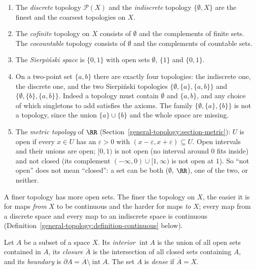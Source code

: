 \begin{example}\label{general-topology:example-topologies}
\begin{enumerate}
\item The \emph{discrete} topology $\mathcal{P}(X)$ and the \emph{indiscrete} topology $\{\emptyset, X\}$ are the finest and the
coarsest topologies on $X$.
\item The \emph{cofinite} topology on $X$ consists of $\emptyset$ and the complements of finite sets. The \emph{cocountable} topology
consists of $\emptyset$ and the complements of countable sets.
\item The \emph{Sierpi\'nski space} is $\{0, 1\}$ with open sets $\emptyset$, $\{1\}$ and $\{0, 1\}$.
\item On a two-point set $\{a, b\}$ there are exactly four topologies: the indiscrete one, the discrete one, and the two Sierpi\'nski topologies $\{\emptyset, \{a\}, \{a, b\}\}$ and
$\{\emptyset, \{b\}, \{a, b\}\}$. Indeed a topology must contain $\emptyset$ and $\{a, b\}$, and any choice of which singletons to add satisfies the axioms. The family $\{\emptyset, \{a\}, \{b\}\}$ is not a
topology, since the union $\{a\} \cup \{b\}$ and the whole space are missing.
\item The \emph{metric topology} of $\RR$ (Section~\ref{general-topology:section-metric}): $U$ is open if every $x \in U$ has an $\varepsilon > 0$ with $(x - \varepsilon, x + \varepsilon) \subseteq U$. Open
intervals and their unions are open; $[0, 1)$ is not open (no interval around $0$ fits inside) and not closed (its complement $(-\infty, 0) \cup [1, \infty)$ is not open at $1$). So ``not open'' does not mean
``closed'': a set can be both ($\emptyset$, $\RR$), one of the two, or neither.
\end{enumerate}
A finer topology has more open sets. The finer the topology on $X$, the easier it is for maps \emph{from} $X$ to be continuous and the harder for maps \emph{to} $X$; every map from a discrete space and every
map to an indiscrete space is continuous (Definition~\ref{general-topology:definition-continuous} below).
\end{example}

\begin{definition}\label{general-topology:definition-closure}
Let $A$ be a subset of a space $X$. Its \emph{interior} $\operatorname{int} A$ is the union of all open sets contained in $A$, its
\emph{closure} $\overline{A}$ is the intersection of all closed sets containing $A$, and its \emph{boundary} is
$\partial A = \overline{A} \setminus \operatorname{int} A$. The set $A$ is \emph{dense} if $\overline{A} = X$.
\end{definition}

